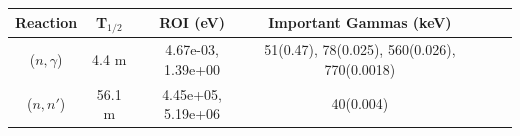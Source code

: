 \begin{table}[h]
\centering
\begin{tabular}{ |c|c|c|c|c|c|c| }
 \hline
 Reaction & T$_{1/2}$ & ROI (eV) & Important Gammas (keV) \\
 \hline 
 ($n,\gamma$) &  4.4 m & 4.67e-03, 1.39e+00 & 51(0.47), 78(0.025), 560(0.026), 770(0.0018) \\ 
\hline
 ($n,n'$) & 56.1 m & 4.45e+05, 5.19e+06 & 40(0.004) \\ 
\hline
\end{tabular}
\end{table}
